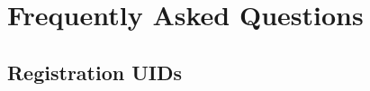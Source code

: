 % 
% 
% 
% 
% 
% 

\section{Frequently Asked Questions}
\label{sec:faq}

\subsection{Registration UIDs}
\label{faq:reguid-faq}

